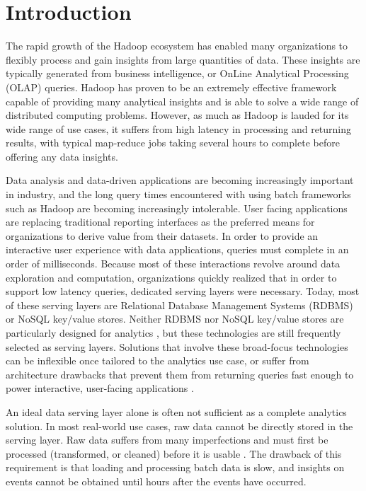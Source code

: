 \documentclass{vldb}
\begin{document}
\section{Introduction}
The rapid growth of the Hadoop\cite{shvachko2010hadoop} ecosystem has enabled
many organizations to flexibly process and gain insights from large quantities
of data. These insights are typically generated from business intelligence, or
OnLine Analytical Processing (OLAP) queries. Hadoop has proven to be an
extremely effective framework capable of providing many analytical insights and
is able to solve a wide range of distributed computing problems. However, as
much as Hadoop is lauded for its wide range of use cases, it suffers from
high latency in processing and returning results, with typical map-reduce jobs
taking several hours to complete before offering any data insights.

Data analysis and data-driven applications are becoming increasingly important
in industry, and the long query times encountered with using batch frameworks
such as Hadoop are becoming increasingly intolerable. User facing applications
are replacing traditional reporting interfaces as the preferred means for
organizations to derive value from their datasets. In order to provide an
interactive user experience with data applications, queries must complete in an
order of milliseconds. Because most of these interactions revolve around data
exploration and computation, organizations quickly realized that in order to 
support low latency queries, dedicated serving layers were necessary. Today,
most of these serving layers are Relational Database Management Systems (RDBMS)
or NoSQL key/value stores. Neither RDBMS nor NoSQL key/value stores are
particularly designed for analytics \cite{stonebraker2009requirements}, but
these technologies are still frequently selected as serving layers. Solutions
that involve these broad-focus technologies can be inflexible once tailored to
the analytics use case, or suffer from architecture drawbacks that prevent them
from returning queries fast enough to power interactive, user-facing
applications \cite{tschetter2011druid}.

An ideal data serving layer alone is often not sufficient as a complete analytics
solution. In most real-world use cases, raw data cannot be directly stored in
the serving layer. Raw data suffers from many imperfections and must first be
processed (transformed, or cleaned) before it is usable
\cite{stonebraker2010mapreduce}. The drawback of this requirement is that
loading and processing batch data is slow, and insights on events cannot be
obtained until hours after the events have occurred.
\end{document}
